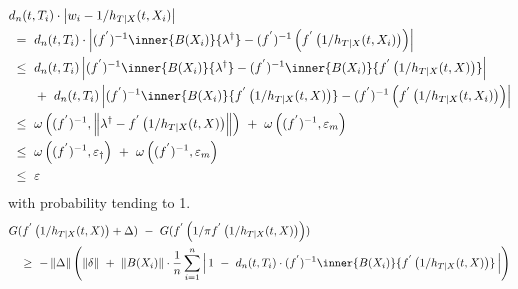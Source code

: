 \begin{align*}
&
d_n(t,T_i)
   \cdot
   \left| 
   w_i
   -
   1 / 
h_{T|X}(t,X_i)
   \right|
   \\
   & 
   \ 
   =
   \ 
d_n(t,T_i)
   \cdot
   \left| 
   (
      f ^ { ' }
   )
   ^ {-1}
   \inner
   {B(X_i)}
   { \lambda ^ \dagger }
   -
     (f ^ { ' }) ^ { -1 }
     \left( 
      f ^ { ' }
      \left( 
   1 / 
h_{T|X}(t,X_i)
      \right)
     \right)
   \right|
   \\
   & 
   \ 
   \le
   \ 
d_n(t,T_i)
   \left| 
   (
      f ^ { ' }
   )
   ^ {-1}
   \inner
   {B(X_i)}
   { \lambda ^ \dagger }
   -
   (
      f ^ { ' }
   )
   ^ {-1}
          \inner
          {B(X_i)}
          {
      f ^ { ' }
      \left( 
   1 / 
h_{T|X}(t,X)
      \right)
          }
   \right|
   \\
   &
   \qquad
   +
   \ 
d_n(t,T_i)
   \left| 
   (
      f ^ { ' }
   )
   ^ {-1}
          \inner
          {B(X_i)}
          {
      f ^ { ' }
      \left( 
   1 / 
h_{T|X}(t,X)
      \right)
          }
   -
     (f ^ { ' }) ^ { -1 }
     \left( 
      f ^ { ' }
      \left( 
   1 / 
h_{T|X}(t,X_i)
      \right)
     \right)
   \right|
   \\
   &
   \ 
   \le
   \ 
   \omega
   \left( 
     (f ^ { ' }) ^ { -1 }
     ,
     \norm{ \lambda ^ \dagger 
     - 
      f ^ { ' }
      \left( 
   1 / 
h_{T|X}(t,X)
      \right)
 }
   \right)
   \ 
   +
   \ 
   \omega
   \left( 
     (f ^ { ' }) ^ { -1 }
     ,
     \varepsilon _ m
   \right)
   \\
   &
   \ 
   \le
   \ 
   \omega
   \left( 
     (f ^ { ' }) ^ { -1 }
     ,
     \varepsilon _ \dagger
   \right)
   \ 
   +
   \ 
   \omega
   \left( 
     (f ^ { ' }) ^ { -1 }
     ,
     \varepsilon _ m
   \right)
   \\
   &
   \ 
   \le
   \ 
   \varepsilon
 \end{align*}
 with probability tending to 1.
\begin{align*}
   &
     G
     (
      f ^ { ' }
      \left( 
   1 / 
h_{T|X}(t,X)
      \right)
      +
      \Delta
     )
     \ 
     -
     \ 
     G
     (
      f ^ { ' }
      \left( 
        1 / \pi 
      f ^ { ' }
      \left( 
   1 / 
h_{T|X}(t,X)
      \right)
      \right)
     )
     \\
     &
     \quad
     \ge
     \ 
     -
     \norm{\Delta}
     \left( 
     \norm{\delta}
     \ 
     +
     \ 
     \norm{B(X_i)}
     \cdot
     \frac{1}{n}
     \sum_{i=1}^{n} 
     \left| 
     \,
      1
     \ 
      -
     \ 
     d_n(t,T_i)
        \cdot
     (f ^ { ' }) ^ { -1 }
          \inner
          {B(X_i)}
          {
      f ^ { ' }
      \left( 
   1 / 
h_{T|X}(t,X)
      \right)
          }
          \,
     \right|
     \right)
 \end{align*}
